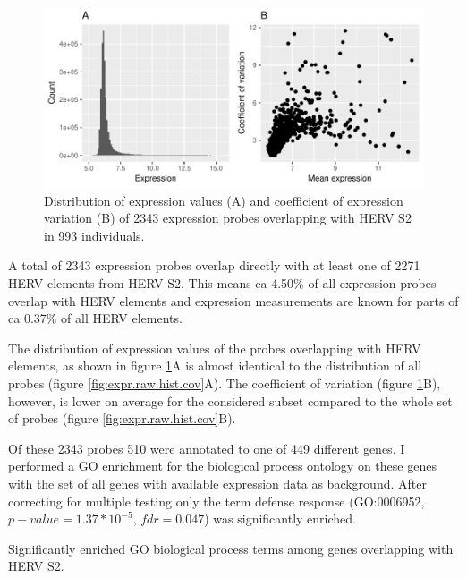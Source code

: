\documentclass[a4paper,12pt,twoside,openright]{article}
\begin{document}
\begin{figure}[tb]
	\includegraphics[scale = 1, keepaspectratio = true]{../figures/hervS2_expr_raw_hist_cov}  
	\caption{Distribution of expression values (A) and coefficient of expression variation (B) of 2343 expression probes overlapping with HERV S2 in 993 individuals.}
    \label{fig:hervS2.expr.hist.cov}
\end{figure}

A total of 2343 expression probes overlap directly with at least one of 2271 HERV elements from HERV S2. This means ca 4.50\% of all expression probes overlap with HERV elements and expression measurements are known for parts of ca 0.37\% of all HERV elements.

The distribution of expression values of the probes overlapping with HERV elements, as shown in figure \ref{fig:hervS2.expr.hist.cov}A is almost identical to the distribution of all probes (figure \ref{fig:expr.raw.hist.cov}A). The coefficient of variation (figure \ref{fig:hervS2.expr.hist.cov}B), however, is lower on average for the considered subset compared to the whole set of probes (figure \ref{fig:expr.raw.hist.cov}B).

Of these 2343 probes 510 were annotated to one of 449 different genes. I performed a GO enrichment for the biological process ontology on these genes with the set of all genes with available expression data as background. After correcting for multiple testing only the term defense response (GO:0006952, $p-value=1.37*10^{-5}$, $fdr=0.047$) was significantly enriched.

\begin{table}[h!]
  \begin{center}
  \end{center}        
	\caption{Significantly enriched GO biological process terms among genes overlapping with HERV S2.}
	\label{tab:hervS2.2kb.expr.enrichment}
\end{table}
\end{document}
